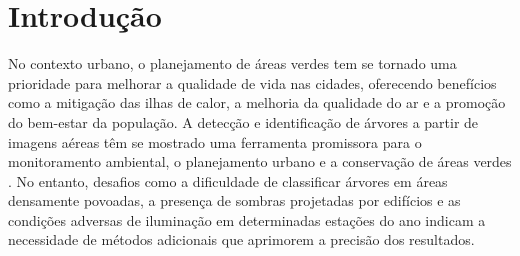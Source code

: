 \documentclass[
    12pt,                   %
    openright,              %
    oneside,                %
    a4paper,                %
    sumario=tradicional,    %
    english,                %
    brazil,                 %
    ]{abntex2}
\begin{document}
\listoffigures*
\cleardoublepage

\listoftables*
\cleardoublepage




\newpage
 

\tableofcontents*
\cleardoublepage

\textual

\chapter{Introdução}\label{sec:introducao}
    No contexto urbano, o planejamento de áreas verdes tem se tornado uma prioridade para melhorar a qualidade de vida nas cidades, oferecendo benefícios como a mitigação das ilhas de calor, a melhoria da qualidade do ar e a promoção do bem-estar da população. A detecção e identificação de árvores a partir de imagens aéreas têm se mostrado uma ferramenta promissora para o monitoramento ambiental, o planejamento urbano e a conservação de áreas verdes \cite{herold2019role, f12121736}. No entanto, desafios como a dificuldade de classificar árvores em áreas densamente povoadas, a presença de sombras projetadas por edifícios e as condições adversas de iluminação em determinadas estações do ano indicam a necessidade de métodos adicionais que aprimorem a precisão dos resultados.
\end{document}
